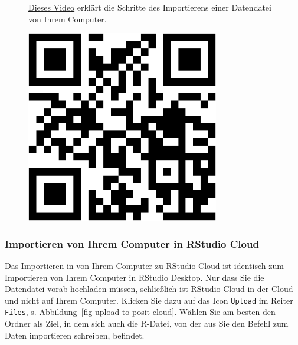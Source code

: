 \documentclass[
  a4paper,
]{scrbook}
\theoremstyle{definition}
\theoremstyle{definition}
\theoremstyle{definition}
\theoremstyle{remark}
\begin{document}
\begin{figure}

\begin{minipage}{0.80\linewidth}
\href{https://youtu.be/B_nuN-M0pQM}{Dieses Video} erklärt die Schritte
des Importierens einer Datendatei von Ihrem Computer.\end{minipage}%
%
\begin{minipage}{0.20\linewidth}

\begin{center}
\includegraphics[width=0.75\textwidth,height=\textheight]{020-R_files/figure-pdf/unnamed-chunk-31-1.pdf}
\end{center}

\end{minipage}%

\end{figure}%

\subsubsection{Importieren von Ihrem Computer in RStudio
Cloud}\label{importieren-von-ihrem-computer-in-rstudio-cloud}

Das Importieren in von Ihrem Computer zu RStudio Cloud ist identisch zum
Importieren von Ihrem Computer in RStudio Desktop. Nur dass Sie die
Datendatei vorab hochladen müssen, schließlich ist RStudio Cloud in der
Cloud und nicht auf Ihrem Computer. Klicken Sie dazu auf das Icon
\texttt{Upload} im Reiter \texttt{Files}, s.
Abbildung~\ref{fig-upload-to-posit-cloud}. Wählen Sie am besten den
Ordner als Ziel, in dem sich auch die R-Datei, von der aus Sie den
Befehl zum Daten importieren schreiben, befindet.
\end{document}
